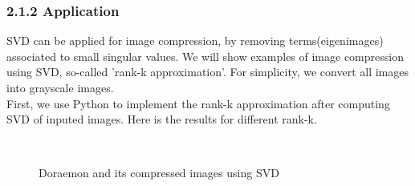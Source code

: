 \documentclass[12pt]{article}
\begin{document}
\subsubsection*{2.1.2 \quad Application}
SVD can be applied for image compression, by removing terms(eigenimages) associated to small singular values.
We will show examples of image compression using SVD, so-called 'rank-k approximation'. For simplicity, we convert
all images into grayscale images.\\
First, we use Python to implement the rank-k approximation after computing SVD of inputed images. Here is the results for
different rank-k.
\begin{figure}[H]
    \centering
    \\
    \caption{Doraemon and its compressed images using SVD}
    \label{ref_label_overall}
\end{figure}
\end{document}
